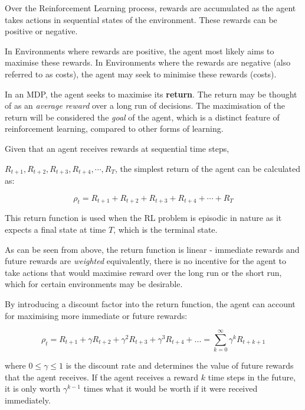 \documentclass{article}
\begin{document}
Over the Reinforcement Learning process, rewards are accumulated as the agent takes actions in sequential states of the environment. These rewards can be positive or negative. 

In Environments where rewards are positive, the agent most likely aims to maximise these rewards. In Environments where the rewards are negative (also referred to as costs), the agent may seek to minimise these rewards (costs)\cite{RLNotes}.

In an MDP, the agent seeks to maximise its \textbf{return}. The return may be thought of as an \textit{average reward} over a long run of decisions. The maximisation of the return will be considered the \textit{goal} of the agent, which is a distinct feature of reinforcement learning, compared to other forms of learning.

Given that an agent receives rewards at sequential time steps, 

$R_{t+1}, R_{t+2}, R_{t+3}, R_{t+4}, \cdots, R_T$, the simplest return of the agent can be calculated as: 

\begin{equation} \label{eq:1}
\rho_{t} = R_{t+1} + R_{t+2} + R_{t+3} + R_{t+4} + \cdots + R_T
\end{equation}

This return function is used when the RL problem is episodic in nature as it expects a final state at time $T$, which is the terminal state.

As can be seen from above, the return function is linear - immediate rewards and future rewards are \textit{weighted} equivalently, there is no incentive for the agent to take actions that would maximise reward over the long run or the short run, which for certain environments may be desirable. 

By introducing a discount factor into the return function, the agent can account for maximising more immediate or future rewards\cite{RLNotes}: 

\begin{equation} \label{eq:2}
\rho_{t} = R_{t+1} + \gamma R_{t+2} +  \gamma^2 R_{t+3} + \gamma^3 R_{t+4}  + ... = \sum_{k=0}^{\infty} \gamma ^k R_{t+k+1}
\end{equation}

where $0 \leq \gamma \leq 1$ is the discount rate and determines the value of future rewards that the agent receives. If the agent receives a reward $k$ time steps in the future, it is only worth $\gamma^{k-1}$ times what it would be worth if it were received immediately.
\end{document}

